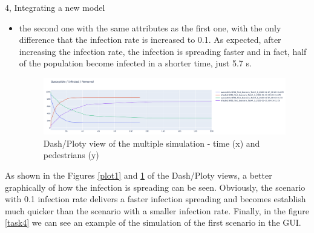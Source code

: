 \documentclass[10pt,a4paper]{article}
\begin{document}
\begin{task}{4, Integrating a new model}
\begin{itemize}
        \item the second one with the same attributes as the first one, with the only difference that the infection rate is increased to 0.1. 
        As expected, after increasing the infection rate, the infection is spreading faster and in fact, half of the population become infected in a shorter time, just 5.7 s.

        \begin{figure} [H]
            \includegraphics[width=15cm]{images/plot2.png}
            \centering
            \caption{Dash/Ploty view of the multiple simulation - time (x) and pedestrians (y)}
            \label{plot2}
        \end{figure}
        
    \end{itemize}

As shown in the Figures \ref{plot1} and \ref{plot2} of the Dash/Ploty views, a better graphically of how the infection is spreading can be seen. Obviously, the scenario with 0.1 infection rate delivers a faster infection spreading and becomes establish much quicker than the scenario with a smaller infection rate.
Finally, in the figure \ref{task4} we can see an example of the simulation of the first scenario in the GUI.


\end{task}
\end{document}
